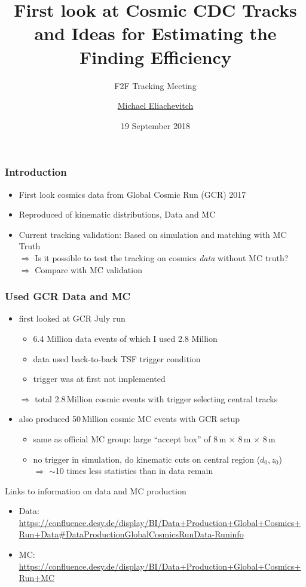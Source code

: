\documentclass[18pt]{beamer}
\title{First look at Cosmic CDC Tracks and Ideas for Estimating the Finding Efficiency}
\subtitle{F2F Tracking Meeting}
\author{\underline{Michael Eliachevitch}}
\date{19 September 2018}
\institute{ETP - KIT}
\begin{document}

  \begin{frame}
  \titlepage
  \end{frame}

  \begin{frame}
    \frametitle{Introduction}
    \begin{itemize}
    \item First look cosmics data from Global Cosmic Run (GCR) 2017
    \item Reproduced of kinematic distributions, Data and MC
    \item Current tracking validation: Based on simulation and matching with MC Truth\\
      $\Rightarrow$ Is it possible to test the tracking on cosmics \emph{data} without MC truth?\\
      $\Rightarrow$ Compare with MC validation
    \end{itemize}
  \end{frame}

  \begin{frame}
    \frametitle{Used GCR Data and MC}
    \begin{itemize}
    \item first looked at GCR July run
      \begin{itemize}
      \item 6.4 Million data events of which I used 2.8 Million
      \item data used back-to-back TSF trigger condition
      \item trigger was at first not implemented 
      \end{itemize}
      $\Rightarrow$ total 2.8\,Million cosmic events with trigger selecting central tracks\\
    \item also produced 50\,Million cosmic MC events with GCR setup
      \begin{itemize}
      \item same as official MC group: large ``accept box'' of 8\,m $\times$ 8\,m $\times$ 8\,m 
      \item no trigger in simulation, do kinematic cuts on central region ($d_0, z_0$)\\
        $\Rightarrow$  $\sim$10 times less statistics than in data remain
      \end{itemize}
    \end{itemize}

    \begin{block}{Links to information on data and MC production}
      \begin{itemize}
      \item Data: \footnotesize{\url{https://confluence.desy.de/display/BI/Data+Production+Global+Cosmics+Run+Data\#DataProductionGlobalCosmicsRunData-Runinfo}}
      \item MC: \footnotesize{\url{https://confluence.desy.de/display/BI/Data+Production+Global+Cosmics+Run+MC}}
      \end{itemize}
    \end{block}
  \end{frame}
\end{document}

